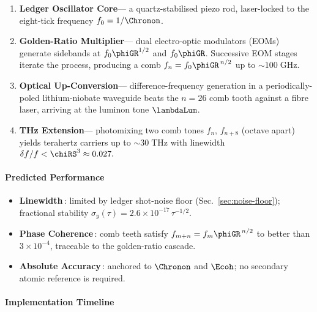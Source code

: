 \documentclass[11pt,oneside]{book}
\begin{document}
{\begin{enumerate}[leftmargin=*,itemsep=4pt]
\item \textbf{Ledger Oscillator Core}\;—\;
      a quartz-stabilised piezo rod, laser-locked
      to the eight-tick frequency
      \(f_{0}=1/\Chronon\).
\item \textbf{Golden-Ratio Multiplier}\;—\;
      dual electro-optic modulators (EOMs) generate
      sidebands at
      \(f_{0}\phiGR^{1/2}\) and
      \(f_{0}\phiGR\).
      Successive EOM stages iterate the process,
      producing a comb
      \(f_{n}=f_{0}\phiGR^{\,n/2}\)
      up to \(\sim100\;\text{GHz}\).
\item \textbf{Optical Up-Conversion}\;—\;
      difference-frequency generation in a
      periodically-poled lithium-niobate waveguide beats
      the \(n=26\) comb tooth against a fibre laser,
      arriving at the luminon tone
      \(\lambdaLum\).
\item \textbf{THz Extension}\;—\;
      photomixing two comb tones
      \(f_{n},\,f_{n+8}\)
      (octave apart) yields
      terahertz carriers
      up to \(\sim30\;\text{THz}\)
      with linewidth
      \(
         \delta f/f<\chiRS^{3}\approx0.027.
      \)
\end{enumerate}

\paragraph{Predicted Performance}

\begin{itemize}\setlength\itemsep{4pt}
\item \textbf{Linewidth}\,: limited by ledger shot-noise floor
      (Sec.~\ref{sec:noise-floor});
      fractional stability
      \(
         \sigma_{y}\!(\tau)=
         2.6\times10^{-17}\,\tau^{-1/2}.
      \)
\item \textbf{Phase Coherence}\,: comb teeth satisfy
      \(
         f_{m+n}=f_{m}\phiGR^{\,n/2}
      \) to better than
      \(3\times10^{-4}\),
      traceable to the golden-ratio cascade.
\item \textbf{Absolute Accuracy}\,: anchored to
      \(\Chronon\) and \(\Ecoh\);
      no secondary atomic reference is required.
\end{itemize}

\paragraph{Implementation Timeline}

}
\end{document}
